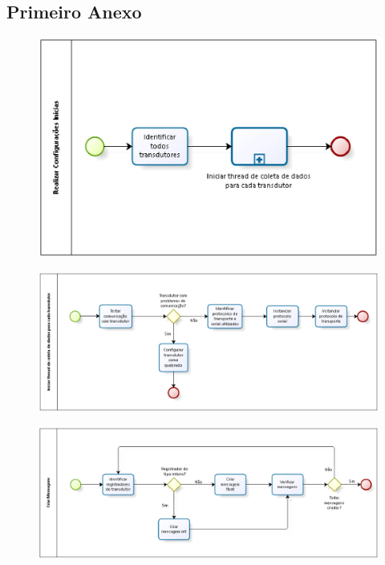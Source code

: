 \begin{anexosenv}

\partanexos

\chapter{Primeiro Anexo}
\begin{figure}[!h]
    \centering
    \includegraphics[keepaspectratio=true,scale=1.0]{figuras/process_2.eps}
    \caption{}
    \label{process_2}
\end{figure}

\begin{figure}[!h]
    \centering
    \includegraphics[keepaspectratio=true,scale=0.7,angle=90]{figuras/process_3.eps}
    \caption{}
    \label{process_3}
\end{figure}

\begin{figure}[!h]
    \centering
    \includegraphics[keepaspectratio=true,scale=0.7,angle=90]{figuras/process_4.eps}
    \caption{}
    \label{process_4}
\end{figure}


\end{anexosenv}
